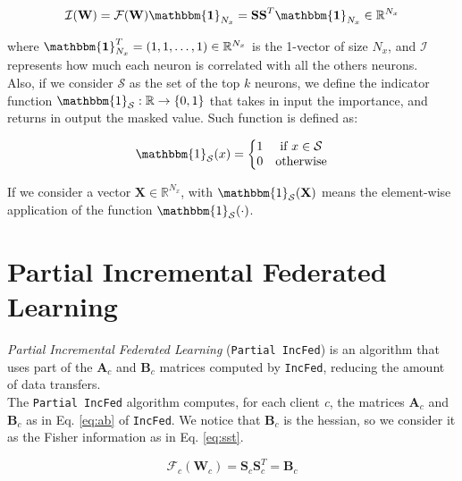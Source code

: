 \begin{equation}\label{eq:imp_vec}
    \mathcal{I}(\textbf{W})=\mathcal{F}(\textbf{W})\mathbbm{\bf 1}_{N_x}=\textbf{SS}^T\mathbbm{\bf 1}_{N_x}\in\mathbb{R}^{N_x}
\end{equation}

where $\mathbbm{\bf 1}^T_{N_x}=(1,1,\dots,1)\in\mathbb{R}^{N_x}$ is the 1-vector of size $N_x$, and $\mathcal{I}$ represents how much each neuron is correlated with all the others neurons.\\

Also, if we consider $\mathcal{S}$ as the set of the top $k$ neurons, we define the indicator function $\mathbbm{1}_{\mathcal{S}}:\mathbb{R}\rightarrow{\{0,1\}}$ that takes in input the importance, and returns in output the masked value. Such function is defined as:

\begin{equation}
    \mathbbm{1}_{\mathcal{S}}(x)=
    \left\{\begin{matrix}
    1 & \text{if }x\in\mathcal{S}\\ 
    0 & \text{otherwise}
    \end{matrix}\right.
\end{equation}

If we consider a vector $\textbf{X}\in\mathbb{R}^{N_x}$, with $\mathbbm{1}_{\mathcal{S}}(\textbf{X})$ means the element-wise application of the function $\mathbbm{1}_{\mathcal{S}}(\cdot)$.


\section{Partial Incremental Federated Learning}

\textit{Partial Incremental Federated Learning} (\texttt{Partial IncFed}) is an algorithm that uses part of the $\textbf{A}_c$ and $\textbf{B}_c$ matrices computed by \texttt{IncFed}, reducing the amount of data transfers.\\

The \texttt{Partial IncFed} algorithm computes, for each client \textit{c}, the matrices $\textbf{A}_c$ and $\textbf{B}_c$ as in Eq. \ref{eq:ab} of \texttt{IncFed}. We notice that $\textbf{B}_c$ is the hessian, so we consider it as the Fisher information as in Eq. \ref{eq:sst}.

\begin{equation}
    \mathcal{F}_c(\mathbf{W}_c)=\textbf{S}_c\textbf{S}_c^T=\textbf{B}_c
\end{equation}

